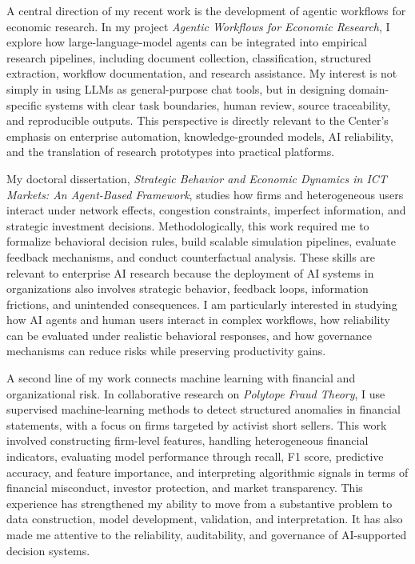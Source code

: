 \documentclass[11pt]{article}
\begin{document}
A central direction of my recent work is the development of agentic workflows for economic research. In my project \emph{Agentic Workflows for Economic Research}, I explore how large-language-model agents can be integrated into empirical research pipelines, including document collection, classification, structured extraction, workflow documentation, and research assistance. My interest is not simply in using LLMs as general-purpose chat tools, but in designing domain-specific systems with clear task boundaries, human review, source traceability, and reproducible outputs. This perspective is directly relevant to the Center's emphasis on enterprise automation, knowledge-grounded models, AI reliability, and the translation of research prototypes into practical platforms.

My doctoral dissertation, \emph{Strategic Behavior and Economic Dynamics in ICT Markets: An Agent-Based Framework}, studies how firms and heterogeneous users interact under network effects, congestion constraints, imperfect information, and strategic investment decisions. Methodologically, this work required me to formalize behavioral decision rules, build scalable simulation pipelines, evaluate feedback mechanisms, and conduct counterfactual analysis. These skills are relevant to enterprise AI research because the deployment of AI systems in organizations also involves strategic behavior, feedback loops, information frictions, and unintended consequences. I am particularly interested in studying how AI agents and human users interact in complex workflows, how reliability can be evaluated under realistic behavioral responses, and how governance mechanisms can reduce risks while preserving productivity gains.

A second line of my work connects machine learning with financial and organizational risk. In collaborative research on \emph{Polytope Fraud Theory}, I use supervised machine-learning methods to detect structured anomalies in financial statements, with a focus on firms targeted by activist short sellers. This work involved constructing firm-level features, handling heterogeneous financial indicators, evaluating model performance through recall, F1 score, predictive accuracy, and feature importance, and interpreting algorithmic signals in terms of financial misconduct, investor protection, and market transparency. This experience has strengthened my ability to move from a substantive problem to data construction, model development, validation, and interpretation. It has also made me attentive to the reliability, auditability, and governance of AI-supported decision systems.
\end{document}
